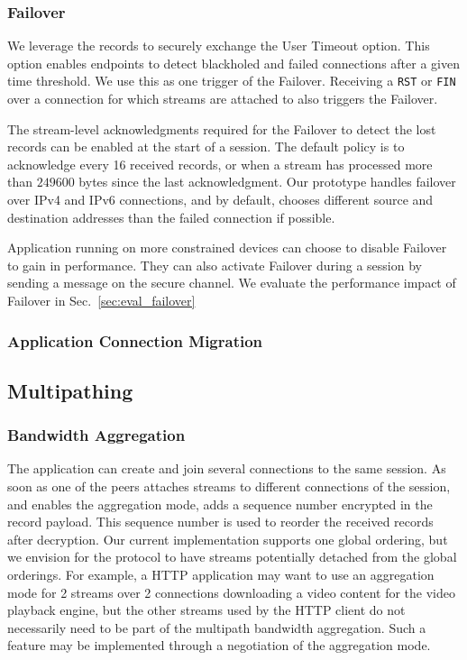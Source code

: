 \subsubsection{Failover}

We leverage the \tcpls records to securely exchange the \tcp User Timeout option.
This option enables endpoints to detect blackholed and failed \tcp connections
after a given time threshold. We use this as one trigger of the Failover.
Receiving a \tcp \texttt{RST} or \texttt{FIN} over a \tcp connection for which
\tcpls streams are attached to also triggers the Failover.

The stream-level acknowledgments required for the Failover to detect the lost
\tcpls records can be enabled at the start of a \tcpls session. The default
policy is to acknowledge every 16 received records, or when a
stream has processed more than $249600$ bytes since the last acknowledgment. 
Our prototype handles failover over IPv4 and IPv6 \tcp connections, and by default, chooses different source and destination addresses than the failed \tcp connection if possible.

Application running on more constrained devices can choose to disable Failover
to gain in performance. They can also activate Failover during a \tcpls session 
by sending a message on the secure channel. 
We evaluate the performance impact of Failover in Sec.~\ref{sec:eval_failover}

\subsubsection{Application Connection Migration}


\subsection{Multipathing}

\subsubsection{Bandwidth Aggregation}
The application can create and join several \tcp connections to
the same \tcpls session. As soon as one of the peers attaches streams to
different \tcp connections of the session, and enables the aggregation mode,
\tcpls adds a sequence number encrypted in the \tls record payload. This
sequence number is used to reorder the received records after decryption. Our
current implementation supports one global ordering, but
we envision for the \tcpls protocol to have streams potentially detached from
the global orderings. For example, a HTTP application may want to use an
aggregation mode for 2 streams over 2 \tcp connections downloading a video
content for the video playback engine, but the other streams used by the HTTP
client do not necessarily need to be part of the multipath bandwidth aggregation.
Such a feature may be implemented through a negotiation of the aggregation
mode.

